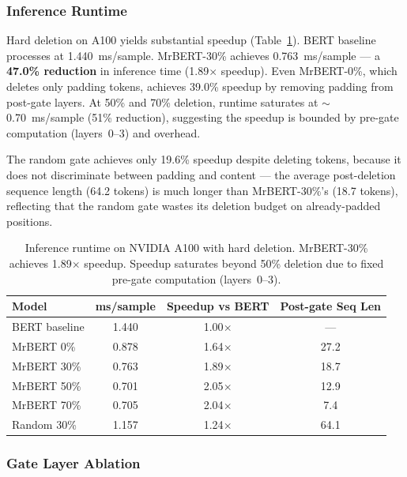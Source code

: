 \subsubsection{Inference Runtime}

Hard deletion on A100 yields substantial speedup (Table~\ref{tab:runtime}).
BERT baseline processes at 1.440~ms/sample.
MrBERT-30\% achieves 0.763~ms/sample --- a \textbf{47.0\% reduction} in inference time (1.89$\times$ speedup).
Even MrBERT-0\%, which deletes only padding tokens, achieves 39.0\% speedup by removing padding from post-gate layers.
At 50\% and 70\% deletion, runtime saturates at $\sim$0.70~ms/sample (51\% reduction), suggesting the speedup is bounded by pre-gate computation (layers~0--3) and overhead.

The random gate achieves only 19.6\% speedup despite deleting tokens, because it does not discriminate between padding and content --- the average post-deletion sequence length (64.2 tokens) is much longer than MrBERT-30\%'s (18.7 tokens), reflecting that the random gate wastes its deletion budget on already-padded positions.

\begin{table}[h]
\centering
\begin{tabular}{@{}lccc@{}}
\toprule
\textbf{Model} & \textbf{ms/sample} & \textbf{Speedup vs BERT} & \textbf{Post-gate Seq Len} \\
\midrule
BERT baseline   & 1.440 & 1.00$\times$ & --- \\
MrBERT 0\%      & 0.878 & 1.64$\times$ & 27.2 \\
MrBERT 30\%     & 0.763 & 1.89$\times$ & 18.7 \\
MrBERT 50\%     & 0.701 & 2.05$\times$ & 12.9 \\
MrBERT 70\%     & 0.705 & 2.04$\times$ & 7.4 \\
Random 30\%     & 1.157 & 1.24$\times$ & 64.1 \\
\bottomrule
\end{tabular}
\caption{Inference runtime on NVIDIA A100 with hard deletion. MrBERT-30\% achieves 1.89$\times$ speedup. Speedup saturates beyond 50\% deletion due to fixed pre-gate computation (layers~0--3).}
\label{tab:runtime}
\end{table}


\subsubsection{Gate Layer Ablation}

